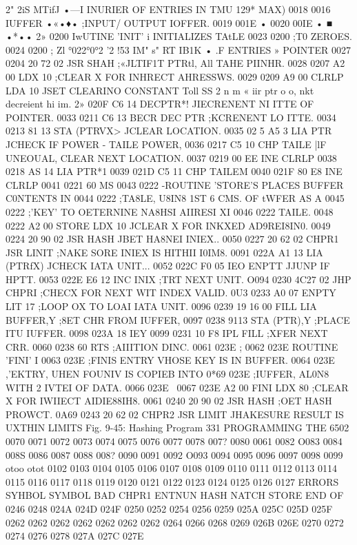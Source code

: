 {{{{{{{{{{{{{{{{{{{{{{{{{{{{{{{{{{{{{{{{{{{{{{{{{{{{{{{{{{{{{{{{{{{{{{{{{{{{{{{{{{{{{{{{{{2" 2iS MTifJ •—I INURIER OF ENTRIES IN TMU 129* MAX)
0018 0016 IUFFER •«•♦• ;INPUT/ OUTPUT IOFFER.
0019 001E •
0020 00IE • ■ •*••
2» 0200 IwUTINE 'INIT' i INITIALIZES TAtLE
0023 0200 ;T0 ZEROES.
0024 0200 ;
Zl °022°0°2 '2 !53 IM" s" RT IB1K • .F ENTRIES » POINTER
0027 0204 20 72 02 JSR SHAH ;«JLTIF1T PTRtl, All TAHE PIINHR.
0028 0207 A2 00 LDX 10 ;CLEAR X FOR INHRECT AHRESSWS.
0029 0209 A9 00 CLRLP LDA 10 JSET CLEARINO CONSTANT
Toll SS 2 n m « iir ptr o o, nkt decreient hi im.
2» 020F C6 14 DECPTR*! JIECRENENT NI ITTE OF POINTER.
0033 0211 C6 13 BECR DEC PTR ;KCRENENT LO ITTE.
0034 0213 81 13 STA (PTRVX> JCLEAR LOCATION.
0035 02 5 A5 3 LIA PTR JCHECK IF POWER - TAILE POWER,
0036 0217 C5 10 CHP TAILE |lF UNEOUAL, CLEAR NEXT LOCATION.
0037 0219 00 EE INE CLRLP
0038 0218 AS 14 LIA PTR*1
0039 021D C5 11 CHP TAILEM
0040 021F 80 E8 INE CLRLP
0041 0221 60 MS
0043 0222 -ROUTINE 'STORE'S PLACES BUFFER C0NTENT8 IN
0044 0222 ;TA8LE, U8IN8 1ST 6 CMS. OF tWFER AS A
0045 0222 ;'KEY' TO OETERNINE NA8HSI AIIRESI XI
0046 0222 {TAILE.
0048 0222 A2 00 STORE LDX 10 JCLEAR X FOR INKXED AD9REI8IN0.
0049 0224 20 90 02 JSR HASH JBET HA8NEI INIEX..
0050 0227 20 62 02 CHPR1 JSR LINIT ;NAKE SORE INIEX IS HITHII I0IM8.
0091 022A A1 13 LIA (PTRfX) JCHECK IATA UNIT...
0052 022C F0 05 IEO ENPTT JJUNP IF HPTT.
0053 022E E6 12 INC INIX ;TRT NEXT UNIT.
O094 0230 4C27 02 JHP CHPRI ;CHECX FOR NEXT WIT INDEX VALID.
0U3 0233 A0 07 ENPTY LIT 17 ;LOOP OX TO LOAI IATA UNIT.
0096 0239 19 16 00 FILL LIA BUFFER,Y ;8ET CHR FROM IUFFER,
0097 0238 9113 STA (PTR),Y ;PLACE ITU IUFFER.
0098 023A 18 IEY
0099 0231 10 F8 IPL FILL ;XFER NEXT CRR.
0060 0238 60 RTS ;AIIITION DINC.
0061 023E ;
0062 023E {ROUTINE 'FINI' I
0063 023E ;FINIS ENTRY VHOSE KEY IS IN BUFFER.
0064 023E ,'EKTRY, UHEN FOUNIV IS COPIEB INTO
0*69 023E ;IUFFER, AL0N8 WITH 2 IVTEI OF DATA.
0066 023E \
0067 023E A2 00 FINI LDX 80 ;CLEAR X FOR IWIIECT AIDIE88IH8.
0061 0240 20 90 02 JSR HASH ;OET HASH PROWCT.
0A69 0243 20 62 02 CHPR2 JSR LIMIT JHAKESURE RESULT IS UXTHIN LIMITS
Fig. 9-45: Hashing Program
331
PROGRAMMING THE 6502
0070
0071
0072
0073
0074
0075
0076
0077
0078
007?
0080
0061
0082
O083
0084
008S
0086
0087
0088
008?
0090
0091
0092
O093
0094
0095
0096
0097
0098
0099
otoo
otot
0102
0103
0104
0105
0106
0107
0108
0109
0110
0111
0112
0113
0114
0115
0116
0117
0118
0119
0120
0121
0122
0123
0124
0125
0126
0127
ERRORS
SYHBOL
SYMBOL
BAD
CHPR1
ENTNUN
HASH
NATCH
STORE
END OF
0246
0248
024A
024D
024F
0250
0252
0254
0256
0259
025A
025C
025D
025F
0262
0262
0262
0262
0262
0262
0262
0264
0266
0268
0269
026B
026E
0270
0272
0274
0276
0278
027A
027C
027E
}}}}}}}}}}}}}}}}}}}}}}}}}}}}}}}}}}}}}}}}}}}}}}}}}}}}}}}}}}}}}}}}}}}}}}}}}}}}}}}}}}}}}}}}}}}}
